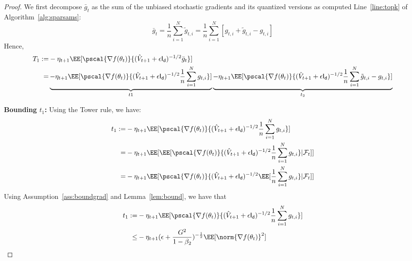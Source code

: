 \documentclass[11pt]{article}
\begin{document}
\begin{proof}
We first decompose $\bar{g}_t$  as the sum of the unbiased stochastic gradients and its quantized versions as computed Line~\ref{line:topk} of Algorithm~\ref{alg:sparsams}:
\begin{equation}
\bar{g}_t = \frac{1}{n}\sum_{i=1}^N \tilde g_{t,i} = \frac{1}{n}\sum_{i=1}^N [ g_{t,i} + \tilde g_{t,i} - g_{t,i}]
\end{equation}
Hence,
\begin{equation}
\begin{split}
T_1 := & -\eta_{t+1}\EE[\pscal{\nabla f(\theta_t)}{(\hat{V}_{t+1} + \epsilon \mathsf{I_d})^{-1/2} \bar{g}_t}] \\
=  &\underbrace{ -\eta_{t+1}\EE[\pscal{\nabla f(\theta_t)}{(\hat{V}_{t+1} + \epsilon \mathsf{I_d})^{-1/2} \frac{1}{n}\sum_{i=1}^N  g_{t,i}} ]}_{t1} \underbrace{-\eta_{t+1}\EE[\pscal{\nabla f(\theta_t)}{(\hat{V}_{t+1} + \epsilon \mathsf{I_d})^{-1/2} \frac{1}{n}\sum_{i=1}^N  \tilde g_{t,i} - g_{t,i}}]}_{t_2}
\end{split}
\end{equation}

\textbf{Bounding $t_1$:}
Using the Tower rule, we have:
\begin{equation}
\begin{split}
t_1 := &  -\eta_{t+1}\EE[\pscal{\nabla f(\theta_t)}{(\hat{V}_{t+1} + \epsilon \mathsf{I_d})^{-1/2} \frac{1}{n}\sum_{i=1}^N  g_{t,i}} ] \\
=  & -\eta_{t+1}\EE[\EE[\pscal{\nabla f(\theta_t)}{(\hat{V}_{t+1} + \epsilon \mathsf{I_d})^{-1/2} \frac{1}{n}\sum_{i=1}^N  g_{t,i}} | \mathcal{F}_t]] \\
=  & -\eta_{t+1}\EE[\pscal{\nabla f(\theta_t)}{(\hat{V}_{t+1} + \epsilon \mathsf{I_d})^{-1/2}\EE[ \frac{1}{n}\sum_{i=1}^N  g_{t,i}} | \mathcal{F}_t]] 
\end{split}
\end{equation}
Using Assumption~\ref{ass:boundgrad} and Lemma~\ref{lem:bound}, we have that 
\begin{equation}\label{eq:lem2eq1}
\begin{split}
t_1 := &  -\eta_{t+1}\EE[\pscal{\nabla f(\theta_t)}{(\hat{V}_{t+1} + \epsilon \mathsf{I_d})^{-1/2} \frac{1}{n}\sum_{i=1}^N  g_{t,i}} ] \\
\leq & - \eta_{t+1} (\epsilon + \frac{G^2}{1 - \beta_2})^{-\frac{1}{2}} \EE[\norm{\nabla f(\theta_t)}^2] 
 \end{split}
\end{equation}



\end{proof}
\end{document}

